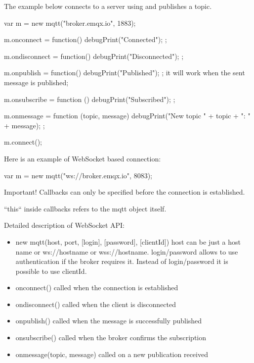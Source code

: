 The example below connects to a server using and publishes a topic.

\begin{listingverbatim}
var m = new mqtt("broker.emqx.io", 1883);

m.onconnect = function() {
	debugPrint("Connected");
};

m.ondisconnect = function() {
	debugPrint("Disconnected");
};

m.onpublish = function() {
	debugPrint("Published");
};
it will work when the sent message is published;

m.onsubscribe = function () {
	debugPrint("Subscribed");
};

m.onmessage = function (topic, message) {
	debugPrint("New topic " + topic + ": " + message);
};

m.connect();
\end{listingverbatim}

Here is an example of WebSocket based connection:

\begin{listingverbatim}
var m = new mqtt("ws://broker.emqx.io", 8083);
\end{listingverbatim}

Important! Callbacks can only be specified before the connection is established.

``this`` inside callbacks refers to the mqtt object itself.

Detailed description of WebSocket API:
\begin{itemize}
\item new mqtt(host, port, [login], [password], [clientId]) host can be just a host name or ws://hostname or wss://hostname. login/password allows to use authentication if the broker requires it. Instead of login/password it is possible to use clientId.
\item onconnect() called when the connection is established
\item ondisconnect() called when the client is disconnected
\item onpublish() called when the message is successfully published
\item onsubscribe() called when the broker confirms the subscription
\item onmessage(topic, message) called on a new publication received
\end{itemize}

